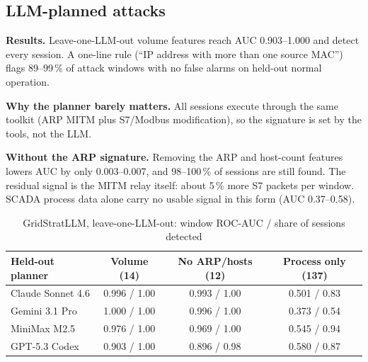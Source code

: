 \documentclass[conference]{IEEEtran}
\begin{document}
\begin{table}[t]
\caption{Proposed attacker-invariant model vs.\ the v2 MLP, 8-class, 1\,\% FPR rule, mean $\pm$ s.d.\ over 3 seeds}\label{tab:inv}
\centering\footnotesize
\setlength{\tabcolsep}{2.5pt}
\end{table}

\subsection{LLM-planned attacks}\label{sec:llm}
\textbf{Results.} Leave-one-LLM-out volume features reach AUC 0.903--1.000 and detect every session. A one-line rule (``IP address with more than one source MAC'') flags 89--99\,\% of attack windows with no false alarms on held-out normal operation.

\textbf{Why the planner barely matters.} All sessions execute through the same toolkit (ARP MITM plus S7/Modbus modification), so the signature is set by the tools, not the LLM.

\textbf{Without the ARP signature.} Removing the ARP and host-count features lowers AUC by only 0.003--0.007, and 98--100\,\% of sessions are still found. The residual signal is the MITM relay itself: about 5\,\% more S7 packets per window. SCADA process data alone carry no usable signal in this form (AUC 0.37--0.58).

\begin{table}[t]
\caption{GridStratLLM, leave-one-LLM-out: window ROC-AUC / share of sessions detected}\label{tab:grid}
\centering\footnotesize
\setlength{\tabcolsep}{3pt}
\begin{tabular}{@{}lccc@{}}
\toprule
Held-out planner & Volume (14) & No ARP/hosts (12) & Process only (137) \\
\midrule
Claude Sonnet 4.6 & 0.996 / 1.00 & 0.993 / 1.00 & 0.501 / 0.83 \\
Gemini 3.1 Pro & 1.000 / 1.00 & 0.996 / 1.00 & 0.373 / 0.54 \\
MiniMax M2.5 & 0.976 / 1.00 & 0.969 / 1.00 & 0.545 / 0.94 \\
GPT-5.3 Codex & 0.903 / 1.00 & 0.896 / 0.98 & 0.580 / 0.87 \\
\bottomrule
\end{tabular}
\end{table}
\end{document}
